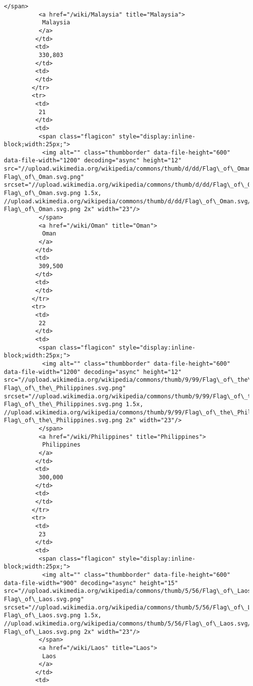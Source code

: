 \documentclass[11pt]{article}
\begin{document}
\begin{Verbatim}[commandchars=\\\{\}]
          </span>
          <a href="/wiki/Malaysia" title="Malaysia">
           Malaysia
          </a>
         </td>
         <td>
          330,803
         </td>
         <td>
         </td>
        </tr>
        <tr>
         <td>
          21
         </td>
         <td>
          <span class="flagicon" style="display:inline-block;width:25px;">
           <img alt="" class="thumbborder" data-file-height="600" data-file-width="1200" decoding="async" height="12" src="//upload.wikimedia.org/wikipedia/commons/thumb/d/dd/Flag\_of\_Oman.svg/23px-Flag\_of\_Oman.svg.png" srcset="//upload.wikimedia.org/wikipedia/commons/thumb/d/dd/Flag\_of\_Oman.svg/35px-Flag\_of\_Oman.svg.png 1.5x, //upload.wikimedia.org/wikipedia/commons/thumb/d/dd/Flag\_of\_Oman.svg/46px-Flag\_of\_Oman.svg.png 2x" width="23"/>
          </span>
          <a href="/wiki/Oman" title="Oman">
           Oman
          </a>
         </td>
         <td>
          309,500
         </td>
         <td>
         </td>
        </tr>
        <tr>
         <td>
          22
         </td>
         <td>
          <span class="flagicon" style="display:inline-block;width:25px;">
           <img alt="" class="thumbborder" data-file-height="600" data-file-width="1200" decoding="async" height="12" src="//upload.wikimedia.org/wikipedia/commons/thumb/9/99/Flag\_of\_the\_Philippines.svg/23px-Flag\_of\_the\_Philippines.svg.png" srcset="//upload.wikimedia.org/wikipedia/commons/thumb/9/99/Flag\_of\_the\_Philippines.svg/35px-Flag\_of\_the\_Philippines.svg.png 1.5x, //upload.wikimedia.org/wikipedia/commons/thumb/9/99/Flag\_of\_the\_Philippines.svg/46px-Flag\_of\_the\_Philippines.svg.png 2x" width="23"/>
          </span>
          <a href="/wiki/Philippines" title="Philippines">
           Philippines
          </a>
         </td>
         <td>
          300,000
         </td>
         <td>
         </td>
        </tr>
        <tr>
         <td>
          23
         </td>
         <td>
          <span class="flagicon" style="display:inline-block;width:25px;">
           <img alt="" class="thumbborder" data-file-height="600" data-file-width="900" decoding="async" height="15" src="//upload.wikimedia.org/wikipedia/commons/thumb/5/56/Flag\_of\_Laos.svg/23px-Flag\_of\_Laos.svg.png" srcset="//upload.wikimedia.org/wikipedia/commons/thumb/5/56/Flag\_of\_Laos.svg/35px-Flag\_of\_Laos.svg.png 1.5x, //upload.wikimedia.org/wikipedia/commons/thumb/5/56/Flag\_of\_Laos.svg/45px-Flag\_of\_Laos.svg.png 2x" width="23"/>
          </span>
          <a href="/wiki/Laos" title="Laos">
           Laos
          </a>
         </td>
         <td>

\end{Verbatim}
\end{document}
